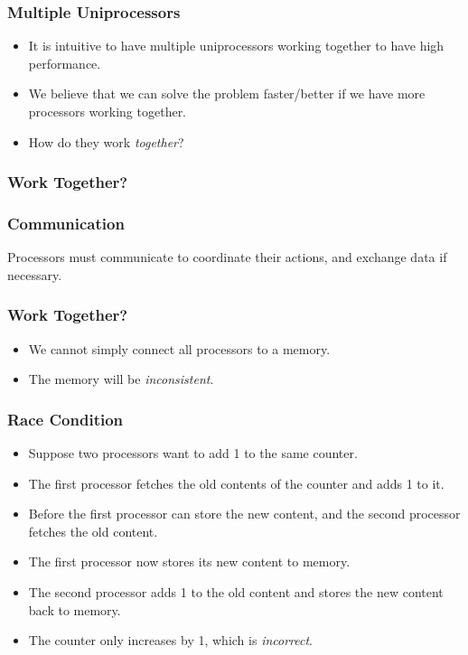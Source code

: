 \documentclass{beamer}
\begin{document}
\begin{CJK}{UTF8}{bsmi}
\begin{frame}
\frametitle{Multiple Uniprocessors}
\begin{itemize}
\item It is intuitive to have multiple uniprocessors working together to have high performance.
\item We believe that we can solve the problem faster/better if we have more processors working together.
\item How do they work {\em together}?
\end{itemize}
\end{frame}

\begin{frame}
\frametitle{Work Together?}
\centerline{}
\end{frame}

\begin{frame}
\frametitle{Communication} 
\huge Processors must communicate to
coordinate their actions, and exchange data if necessary.
\end{frame}


\begin{frame}
\frametitle{Work Together?}
\centerline{}
\begin{itemize}
\item We cannot simply connect all processors to a memory.
\item The memory will be {\em inconsistent}.
\end{itemize}
\end{frame}

\begin{frame}
\frametitle{Race Condition}
\begin{itemize}
\item Suppose two processors want to add 1 to the same counter.
\item The first processor fetches the old contents of the counter and adds 1 to it.
\item Before the first processor can store the new content, and the second processor fetches the old content.
\item The first processor now stores its new content to memory.
\item The second processor adds 1 to the old content and stores the new content back to memory.
\item The counter only increases by 1, which is {\em incorrect}.
\end{itemize}
\end{frame}



\end{CJK}
\end{document}
